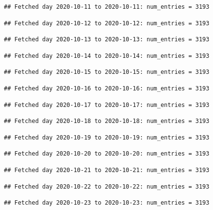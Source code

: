 \documentclass[]{article}
\begin{document}
\begin{verbatim}
## Fetched day 2020-10-11 to 2020-10-11: num_entries = 3193
\end{verbatim}

\begin{verbatim}
## Fetched day 2020-10-12 to 2020-10-12: num_entries = 3193
\end{verbatim}

\begin{verbatim}
## Fetched day 2020-10-13 to 2020-10-13: num_entries = 3193
\end{verbatim}

\begin{verbatim}
## Fetched day 2020-10-14 to 2020-10-14: num_entries = 3193
\end{verbatim}

\begin{verbatim}
## Fetched day 2020-10-15 to 2020-10-15: num_entries = 3193
\end{verbatim}

\begin{verbatim}
## Fetched day 2020-10-16 to 2020-10-16: num_entries = 3193
\end{verbatim}

\begin{verbatim}
## Fetched day 2020-10-17 to 2020-10-17: num_entries = 3193
\end{verbatim}

\begin{verbatim}
## Fetched day 2020-10-18 to 2020-10-18: num_entries = 3193
\end{verbatim}

\begin{verbatim}
## Fetched day 2020-10-19 to 2020-10-19: num_entries = 3193
\end{verbatim}

\begin{verbatim}
## Fetched day 2020-10-20 to 2020-10-20: num_entries = 3193
\end{verbatim}

\begin{verbatim}
## Fetched day 2020-10-21 to 2020-10-21: num_entries = 3193
\end{verbatim}

\begin{verbatim}
## Fetched day 2020-10-22 to 2020-10-22: num_entries = 3193
\end{verbatim}

\begin{verbatim}
## Fetched day 2020-10-23 to 2020-10-23: num_entries = 3193
\end{verbatim}
\end{document}
